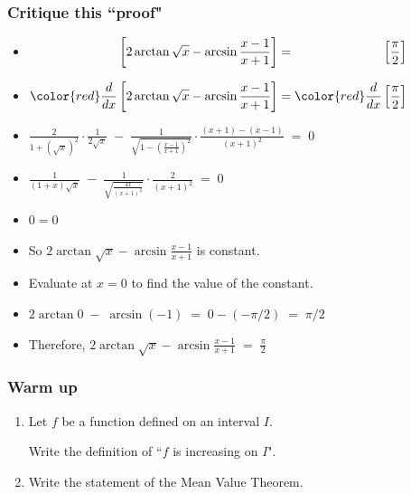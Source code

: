 \begin{frame}[t]
	\fontsize{12}{12}\selectfont
	\frametitle{Critique this ``proof"}
	\begin{itemize}
		\item $\displaystyle \phantom{{\color{red} \frac{d}{dx}}}\left[ 2 \arctan \sqrt{x}
			- \arcsin \frac{x-1}{x+1}\right] = \phantom{{\color{red} \frac{d}{dx}}}\left
			[ \frac{\pi}{2}\right]$

		\item $\displaystyle{\color{red} \frac{d}{dx}}\left[ 2 \arctan \sqrt{x}- \arcsin
			\frac{x-1}{x+1}\right] ={\color{red} \frac{d}{dx}}\left[ \frac{\pi}{2}\right
			]$

		\item $\displaystyle \frac{2}{1+ \left( \sqrt{x}\right)^{2}}\cdot \frac{1}{2\sqrt{x}}
			\; - \; \frac{1}{\sqrt{1- \left( \frac{x-1}{x+1}\right)^{2}}}\cdot \frac{(x+1)
			- (x-1)}{(x+1)^{2}}\; = \; 0$

		\item $\displaystyle \frac{1}{(1+ x)\sqrt{x} }\; - \; \frac{1}{ \sqrt{\frac{4x}{(x+1)^{2}}
			}}\cdot \frac{2}{(x+1)^{2}}\; = \; 0$

		\item $\displaystyle 0 = 0$

		\item So $\displaystyle 2 \arctan \sqrt{x}- \arcsin \frac{x-1}{x+1}$ is constant.

		\item Evaluate at $x=0$ to find the value of the constant.

		\item $\displaystyle 2 \arctan 0 \; - \; \arcsin (-1) \; = \; 0 - \left( - \pi
			/2 \right) \; = \; \pi/2$

		\item Therefore, \;
			$\displaystyle 2 \arctan \sqrt{x}- \arcsin \frac{x-1}{x+1}\; = \; \frac{\pi}{2}$
	\end{itemize}
\end{frame}

\begin{frame}[t]
	\frametitle{Warm up}

	\begin{enumerate}
		\item Let $f$ be a function defined on an interval $I$.

			Write the definition of ``$f$ is increasing on $I$".

		\item Write the statement of the Mean Value Theorem.
	\end{enumerate}
\end{frame}

